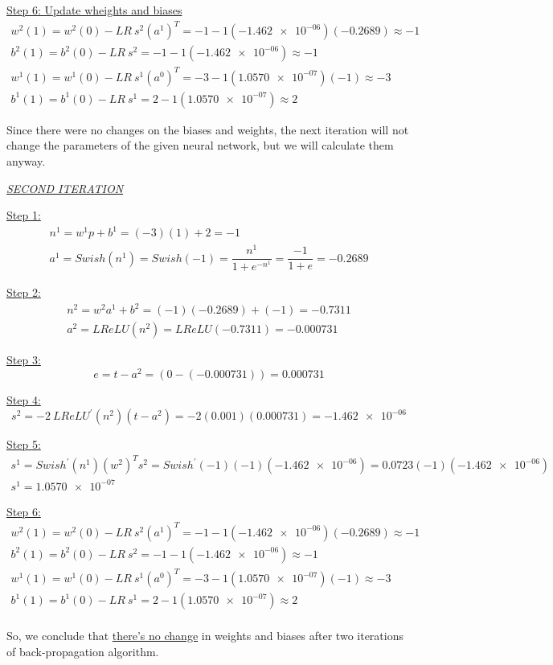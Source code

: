 \underline{Step 6: Update wheights and biases}
\[
\begin{gathered}
	w^{2}(1)=w^{2}(0)-LR\ s^{2}(a^{1})^{T} = -1 - 1(\num{-1.462e-06})(-0.2689) \approx -1 \\
	 b^{2}(1)=b^{2}(0)-LR\ s^{2} = -1 - 1(\num{-1.462e-06}) \approx -1 \\
	 w^{1}(1)=w^{1}(0)-LR\ s^{1}(a^{0})^{T} = -3 - 1(\num{1.0570e-07})(-1) \approx -3 \\
	 b^{1}(1)=b^{1}(0)-LR\ s^{1} = 2 - 1(\num{1.0570e-07}) \approx 2
\end{gathered}
\]

Since there were no changes on the biases and weights, the next iteration will not change the parameters of the given neural network, but we will calculate them anyway.
\vspace*{1mm}
\begin{center}
	\underline{\textit{SECOND ITERATION}}
\end{center}

\underline{Step 1:}
\[
\begin{gathered}
	n^1 = w^1 p + b^1 = (-3)(1) + 2 = -1\\
	a^1 = {Swish}\left(n^1\right) = {Swish}\left(-1\right) = \dfrac{n^1}{1+e^{-n^1}} = \dfrac{-1}{1+e} = -0.2689
\end{gathered}
\]

\underline{Step 2:}
\[
\begin{gathered}
	n^2 = w^2 a^1 + b^2 = (-1)(-0.2689) + (-1) = -0.7311 \\ 
	a^2 = {LReLU}\left(n^2\right) = {LReLU}\left(-0.7311\right) = -0.000731
\end{gathered}
\]

\underline{Step 3:}
\[
e = t-a^2 = \left(0-\left(-0.000731\right)\right) = 0.000731
\]

\underline{Step 4:}
\[
s^2 = -2\ {LReLU}^{'}\left(n^2\right)\left(t-a^2\right) = -2 \left(0.001\right) \left(0.000731\right) = \num{-1.462e-06}
\]

\underline{Step 5:}
\[
\begin{gathered}
	s^1 = Swish^{'} \left(n^1\right) \left(w^2\right)^T s^2 = Swish^{'} \left(-1\right) \left(-1\right) (\num{-1.462e-06}) = 0.0723 (-1) (\num{-1.462e-06}) \\
	s^1 = \num{1.0570e-07}
\end{gathered}
\]

\underline{Step 6:}
\[
\begin{gathered}
	w^{2}(1)=w^{2}(0)-LR\ s^{2}(a^{1})^{T} = -1 - 1(\num{-1.462e-06})(-0.2689) \approx -1 \\
	b^{2}(1)=b^{2}(0)-LR\ s^{2} = -1 - 1(\num{-1.462e-06}) \approx -1 \\
	w^{1}(1)=w^{1}(0)-LR\ s^{1}(a^{0})^{T} = -3 - 1(\num{1.0570e-07})(-1) \approx -3 \\
	b^{1}(1)=b^{1}(0)-LR\ s^{1} = 2 - 1(\num{1.0570e-07}) \approx 2
\end{gathered}
\]\\

So, we conclude that \underline{there's no change} in weights and biases after two iterations of back-propagation algorithm.
